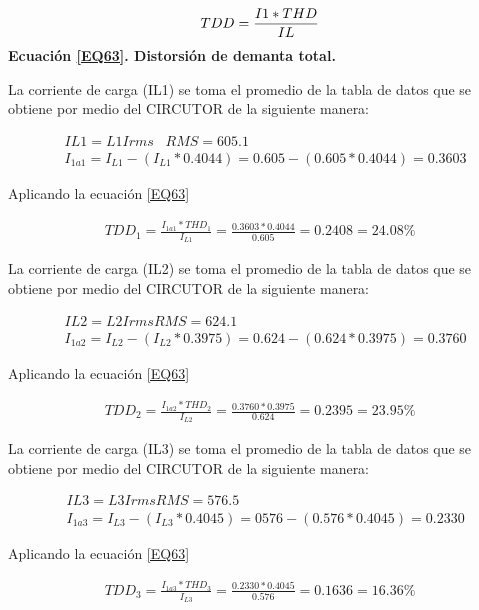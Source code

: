 \begin{equation}\label{EQ63}
TDD=\frac{I1*THD}{IL}\\
\end{equation}
\textbf{Ecuación \ref{EQ63}. Distorsión de demanta total.}

La corriente de carga (IL1) se toma el promedio de la tabla de datos que se obtiene por medio del CIRCUTOR de la siguiente manera:

\begin{align*}
&IL1 = L1Irms\;\;\; RMS = 605.1\\
&I_{1a1} = I_{L1} - (I_{L1} * 0.4044) = 0.605 - (0.605 * 0.4044) = 0.3603
\end{align*}

Aplicando la ecuación \ref{EQ63}

\begin{align*}
TDD_{1} = \frac{I_{1a1}*THD_{1}}{I_{L1}} = \frac{0.3603*0.4044}{0.605} = 0.2408 = 24.08\%
\end{align*}

La corriente de carga (IL2) se toma el promedio de la tabla de datos que se obtiene por medio del CIRCUTOR de la siguiente manera:

\begin{align*}
&IL2 = L2Irms RMS = 624.1\\
&I_{1a2} = I_{L2} - (I_{L2} * 0.3975) = 0.624 - (0.624 * 0.3975) = 0.3760
\end{align*}

Aplicando la ecuación \ref{EQ63}

\begin{align*}
TDD_{2} = \frac{I_{1a2}*THD_{2}}{I_{L2}} = \frac{0.3760*0.3975}{0.624} = 0.2395 = 23.95\%
\end{align*}

La corriente de carga (IL3) se toma el promedio de la tabla de datos que se obtiene por medio del CIRCUTOR de la siguiente manera:

\begin{align*}
&IL3 = L3Irms RMS = 576.5\\
&I_{1a3} = I_{L3} - (I_{L3} * 0.4045) = 0576 - (0.576 * 0.4045) = 0.2330
\end{align*}

Aplicando la ecuación \ref{EQ63}

\begin{align*}
TDD_{3} = \frac{I_{1a3}*THD_{3}}{I_{L3}} = \frac{0.2330*0.4045}{0.576} = 0.1636 = 16.36\%
\end{align*}\\

